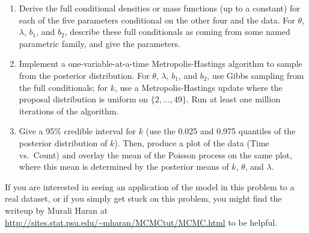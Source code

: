 \documentclass{article}
\begin{document}
\begin{enumerate}
\begin{enumerate}
    \item Derive the full conditional densities or mass functions (up to a
    constant) for each of the five parameters conditional on the other four and
    the data. For $\theta$, $\lambda$, $b_1$, and $b_2$, describe these full
    conditionals as coming from some named parametric family, and give the
    parameters.
    
    \item Implement a one-variable-at-a-time Metropolis-Hastings algorithm to
    sample from the posterior distribution. For $\theta$, $\lambda$, $b_1$, and
    $b_2$, use Gibbs sampling from the full conditionals; for $k$, use a
    Metropolis-Hastings update where the proposal distribution is uniform on
    $\{2, \ldots, 49\}$. Run at least one million iterations of the algorithm.
    
    \item Give a 95\% credible interval for $k$ (use the 0.025 and 0.975
    quantiles of the posterior distribution of $k$). Then, produce a plot of the
    data (Time vs.~Count) and overlay the mean of the Poisson process on the
    same plot, where this mean is determined by the posterior means of $k$,
    $\theta$, and $\lambda$.

    \end{enumerate}

  If you are interested in seeing an application of the model in this problem to
  a real dataset, or if you simply get stuck on this problem, you might find the
  writeup by Murali Haran at 
  \url{http://sites.stat.psu.edu/~mharan/MCMCtut/MCMC.html} to be helpful.

\end{enumerate}
\end{document}
